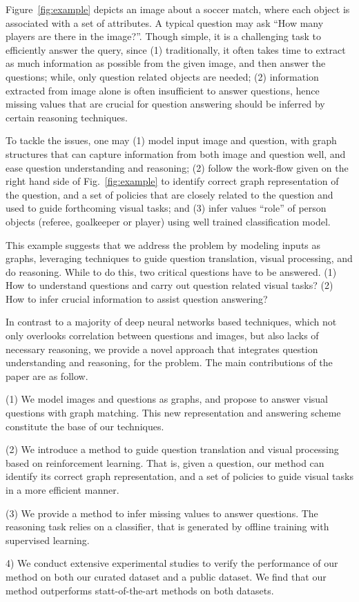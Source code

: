 \begin{example}
Figure~\ref{fig:example} depicts an image about a soccer match, where each object is associated with a set of attributes. A typical question may ask ``How many players are there in the image?''. Though simple, it is a challenging task to efficiently answer the query, since (1) traditionally, it often takes time to extract as much information as possible from the given image, and then answer the questions; while, only question related objects are needed; (2) information extracted from image alone is often insufficient to answer questions, hence missing values that are crucial for question answering should be inferred by certain reasoning techniques. 

To tackle the issues, one may (1) model input \ie image and question, with graph structures that can capture information from both image and question well, and ease question understanding and reasoning; (2) follow the work-flow given on the right hand side of Fig.~\ref{fig:example} to identify correct graph representation of the question, and a set of policies that are closely related to the question and used to guide forthcoming visual tasks; and (3) infer values \eg ``role'' of person objects (referee, goalkeeper or player) using well trained classification model.  
\end{example}

This example suggests that we address the \vqa problem by modeling inputs as graphs, leveraging techniques to guide question translation, visual processing, and do reasoning. While to do this, two critical questions have to be answered. (1) How to understand questions and carry out question related visual tasks? (2) How to infer crucial information to assist question answering?  


\vspace{2ex}
 In contrast to a majority of deep neural networks based \vqa techniques, which not only overlooks correlation between questions and images, but also lacks of necessary reasoning, we provide a novel approach that integrates question understanding and reasoning, for the \vqa problem. The main contributions of the paper are as follow.  

(1) We model images and questions as graphs, and propose to answer visual questions with graph matching. This new representation and answering scheme constitute the base of our techniques.  

(2) We introduce a method to guide question translation and visual processing based on reinforcement learning. That is, given a question, our method can identify its correct graph representation, and a set of policies to guide visual tasks in a more efficient manner. 

(3) We provide a method to infer missing values to answer questions. The reasoning task relies on a classifier, that is generated by offline training with supervised learning. 

4) We conduct extensive experimental studies to verify the performance of our method on both our curated \vqa dataset and a public \vqa dataset. We find that our method outperforms statt-of-the-art methods on both datasets.